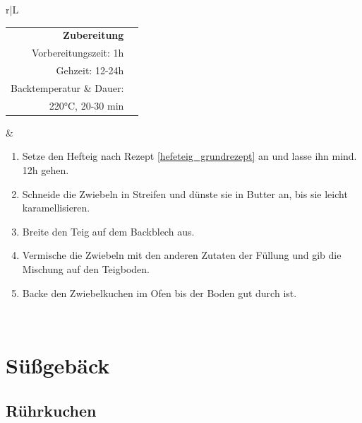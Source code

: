 \documentclass[a4paper, 12pt]{scrbook} 								%
\numberwithin{equation}{section} 									%
\begin{document}
\begin{tabularx}{\textwidth}{r|L}
		
			\begin{tabular}[t]{rr}
				\textbf{Zubereitung}	\\
				\small Vorbereitungszeit: 1h	\\
				\small Gehzeit: 12-24h \\
				\small Backtemperatur \& Dauer:	\\
				220°C, 20-30 min	\\
			\end{tabular}			&	\begin{enumerate}[]
											\item Setze den Hefteig nach Rezept \ref{hefeteig_grundrezept} an und lasse ihn mind. 12h gehen.
											\item Schneide die Zwiebeln in Streifen und dünste sie in Butter an, bis sie leicht karamellisieren.
											\item Breite den Teig auf dem Backblech aus.
											\item Vermische die Zwiebeln mit den anderen Zutaten der Füllung und gib die Mischung auf den Teigboden.
											\item Backe den Zwiebelkuchen im Ofen bis der Boden gut durch ist.
										\end{enumerate}	\\
		\end{tabularx}
		\newpage


	\section{Süßgebäck}
	\newpage


		\subsection{Rührkuchen}	\label{ruehrkuchen}
\end{document}
